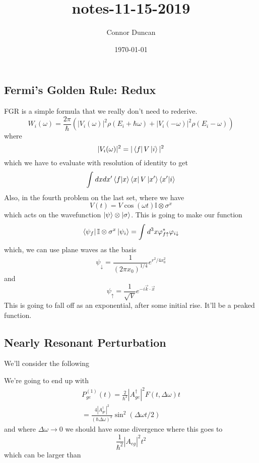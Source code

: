 \documentclass{article}
\author{Connor Duncan}
\date{\today}
\title{notes-11-15-2019}
\theoremstyle{definition}
\begin{document}
\subsection{Fermi's Golden Rule: Redux} FGR is a simple formula that we really don't need to rederive. \begin{equation}\label{eq:fgr} W_i(\omega)=\frac{2\pi}{\hbar}\left(\left|V_i(\omega)\right|^2\rho(E_i+\hbar\omega)+|V_i(-\omega)|^2\rho(E_i-\omega)\right) \end{equation} where \begin{equation} |V_i(\omega)|^2=|\bra{f}V\ket{i}|^2 \end{equation} which we have to evaluate with resolution of identity to get \begin{equation} \int_{}^{}dxdx'\bra{f}\ket{x}\bra{x}V\ket{x'}\bra{x'}\ket{i} \end{equation} Also, in the fourth problem on the last set, where we have \begin{equation} V(t)=V\cos(\omega t)\mathbb{I}\otimes\sigma^x \end{equation} which acts on the wavefunction $\ket{\psi}\otimes\ket{\sigma}$. This is going to make our function \begin{equation} \bra{\psi_f}\mathbb{I}\otimes\sigma^x\ket{\psi_i}=\int_{}^{}d^3x\varphi_{f\uparrow}^*\varphi_{i\downarrow} \end{equation} which, we can use plane waves as the basis \begin{equation} \psi_{\downarrow}=\frac{1}{(2\pi x_0)^{1/4}}e^{r^2/4x_0^2} \end{equation} and \begin{equation} \psi_\uparrow=\frac{1}{\sqrt{V}}e^{-i\vec{k}\cdot\vec{x}} \end{equation} This is going to fall off as an exponential, after some initial rise. It'll be a peaked function. \subsection{Nearly Resonant Perturbation} We'll consider the following \begin{center}  \end{center} We're going to end up with \begin{align} P_{ge}^{(1)}(t)=\frac{2}{\hbar^2}|A^\dag_{ge}|^2F(t,\Delta\omega)t \\ =\frac{4|A_{ge}^\dag|^2}{(\hbar\Delta\omega)^2}\sin^2(\Delta\omega t/2) \end{align} and where $\Delta\omega\rightarrow 0$ we should have some divergence where this goes to \begin{equation} \frac{1}{\hbar^2}|A_{eg}|^2t^2 \end{equation} which can be larger than 
\end{document}
